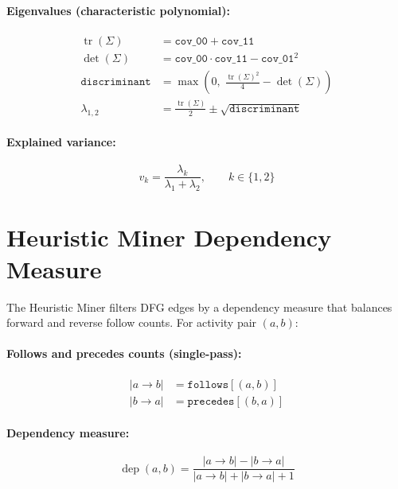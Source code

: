 \documentclass[11pt,a4paper]{article}
\begin{document}
\paragraph{Eigenvalues (characteristic polynomial):}
\begin{align}
  \operatorname{tr}(\Sigma) &= \texttt{cov\_00} + \texttt{cov\_11} \\
  \det(\Sigma) &= \texttt{cov\_00}\cdot\texttt{cov\_11} - \texttt{cov\_01}^2 \\[4pt]
  \texttt{discriminant} &= \max\!\left(0,\;\frac{\operatorname{tr}(\Sigma)^2}{4} - \det(\Sigma)\right) \\[6pt]
  \lambda_{1,2} &= \frac{\operatorname{tr}(\Sigma)}{2} \pm \sqrt{\texttt{discriminant}}
\end{align}

\paragraph{Explained variance:}
\begin{equation}
  v_k = \frac{\lambda_k}{\lambda_1 + \lambda_2}, \qquad k \in \{1,2\}
\end{equation}

\section{Heuristic Miner Dependency Measure}

The Heuristic Miner filters DFG edges by a dependency measure that balances
forward and reverse follow counts. For activity pair $(a,b)$:

\paragraph{Follows and precedes counts (single-pass):}
\begin{align}
  |a \!\to\! b| &= \texttt{follows}[(a,b)] \\
  |b \!\to\! a| &= \texttt{precedes}[(b,a)]
\end{align}

\paragraph{Dependency measure:}
\begin{equation}
  \operatorname{dep}(a,b)
  = \frac{|a \!\to\! b| - |b \!\to\! a|}{|a \!\to\! b| + |b \!\to\! a| + 1}
\end{equation}
\end{document}
